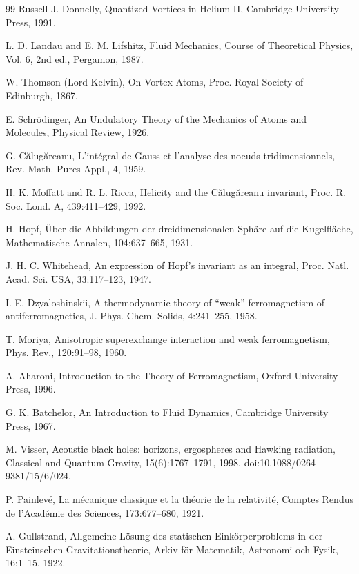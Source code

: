\documentclass[10pt,reprint,aps,onecolumn,nofootinbib]{revtex4-2}
\begin{document}
\begin{thebibliography}{99}
     Russell J. Donnelly, Quantized Vortices in Helium II, Cambridge University Press, 1991.

     L. D. Landau and E. M. Lifshitz, Fluid Mechanics, Course of Theoretical Physics, Vol. 6, 2nd ed., Pergamon, 1987.

     W. Thomson (Lord Kelvin), On Vortex Atoms, Proc. Royal Society of Edinburgh, 1867.

     E. Schr{\"o}dinger, An Undulatory Theory of the Mechanics of Atoms and Molecules, Physical Review, 1926.

     G. C\u{a}lug\u{a}reanu, L'int\'egral de Gauss et l'analyse des noeuds tridimensionnels, Rev. Math. Pures Appl., 4, 1959.

     H. K. Moffatt and R. L. Ricca, Helicity and the C\u{a}lug\u{a}reanu invariant, Proc. R. Soc. Lond. A, 439:411--429, 1992.

     H. Hopf, \"Uber die Abbildungen der dreidimensionalen Sph\"are auf die Kugelfl\"ache, Mathematische Annalen, 104:637--665, 1931.

     J. H. C. Whitehead, An expression of Hopf's invariant as an integral, Proc. Natl. Acad. Sci. USA, 33:117--123, 1947.

     I. E. Dzyaloshinskii, A thermodynamic theory of ``weak'' ferromagnetism of antiferromagnetics, J. Phys. Chem. Solids, 4:241--255, 1958.

     T. Moriya, Anisotropic superexchange interaction and weak ferromagnetism, Phys. Rev., 120:91--98, 1960.

     A. Aharoni, Introduction to the Theory of Ferromagnetism, Oxford University Press, 1996.

     G. K. Batchelor, An Introduction to Fluid Dynamics, Cambridge University Press, 1967.

     M. Visser, Acoustic black holes: horizons, ergospheres and Hawking radiation, Classical and Quantum Gravity, 15(6):1767--1791, 1998, doi:10.1088/0264-9381/15/6/024.

     P. Painlev{\'e}, La m{\'e}canique classique et la th{\'e}orie de la relativit{\'e}, Comptes Rendus de l'Acad{\'e}mie des Sciences, 173:677--680, 1921.

     A. Gullstrand, Allgemeine L{\"o}sung des statischen Eink{\"o}rperproblems in der Einsteinschen Gravitationstheorie, Arkiv f{\"o}r Matematik, Astronomi och Fysik, 16:1--15, 1922.


\end{thebibliography}
\end{document}

